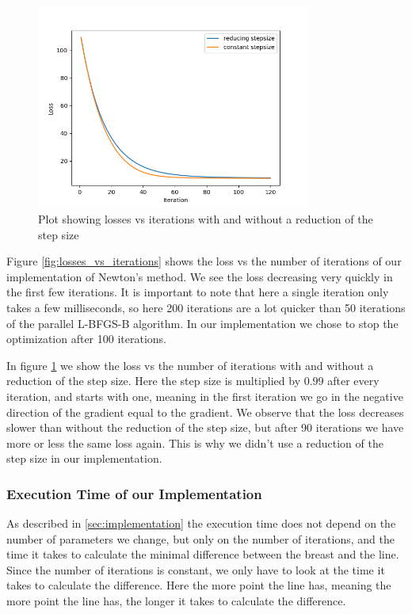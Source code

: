 \begin{figure}[H]
    \centering
    \includegraphics[width = 0.8\textwidth]{figures/plot_losses_vs_iterations_stepsize.png}
    \caption[Newton's method: reducing step size]{Plot showing losses vs iterations with and without a reduction of the step size}
    \label{fig:losses_vs_iterations_stepsize}
\end{figure}

Figure \ref{fig:losses_vs_iterations} shows the loss vs the number of iterations of our implementation of Newton's method. We see the loss decreasing very quickly in the first few iterations. It is important
to note that here a single iteration only takes a few milliseconds, so here 200 iterations are a lot quicker than 50 iterations of the parallel L-BFGS-B algorithm. In our implementation we chose to stop the optimization
after 100 iterations.

In figure \ref{fig:losses_vs_iterations_stepsize} we show the loss vs the number of iterations with and without a reduction of the step size. Here the step size is multiplied by $0.99$ after every iteration, and starts with one, 
meaning in the first iteration we go in the negative direction of the gradient equal to the gradient. We observe that the loss decreases slower than without the reduction of the step size, but after 90 iterations we have more
or less the same loss again. This is why we didn't use a reduction of the step size in our implementation.

\subsubsection{Execution Time of our Implementation}
As described in \ref{sec:implementation} the execution time does not depend on the number of parameters we change, but only on the number of iterations, and the time it takes to calculate the minimal difference between the
breast and the line. Since the number of iterations is constant, we only have to look at the time it takes to calculate the difference. Here the more point the line has, meaning the more point the line has, the longer it takes to calculate the difference.

